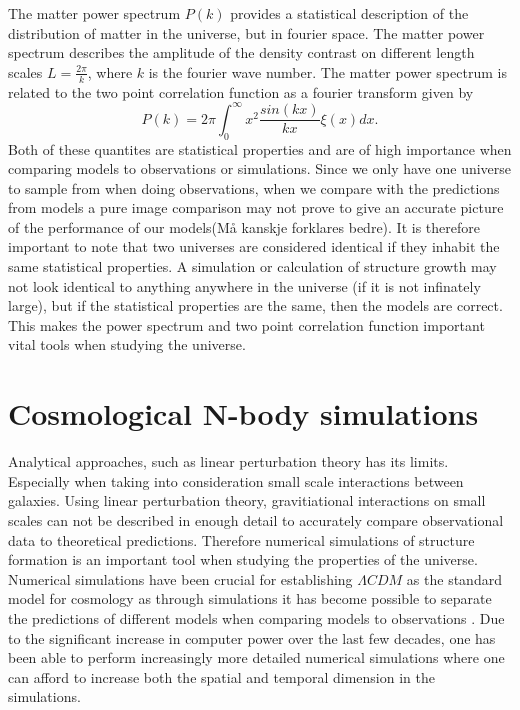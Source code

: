 The matter power spectrum $P(k)$ provides a statistical description of the
distribution of matter in the universe, but in fourier space. The matter power spectrum describes the amplitude of 
the density contrast on different length scales $L=\frac{2\pi}{k}$, where $k$ is
the fourier wave number. The matter power spectrum is related to the two point
correlation function as a fourier transform given by
\begin{equation}
    P(k)=2\pi\int_0^\infty x^2\frac{sin(kx)}{kx}\xi(x)dx.
\end{equation}
Both of these quantites are statistical properties and are of high importance
when comparing models to observations or simulations. Since we only have one
universe to sample from when doing observations, when we compare with the
predictions from models a pure image comparison may not prove to give an
accurate picture of the performance of our models(Må kanskje forklares bedre). It is therefore important to
note that two universes are considered identical if they inhabit the same
statistical properties. A simulation or calculation of structure growth may
not look identical to anything anywhere in the universe (if it is not infinately
large), but if the statistical properties are the same, then the models are
correct. This makes the power spectrum and two point correlation function
important vital tools when studying the universe.

\section{Cosmological N-body simulations}
Analytical approaches, such as linear perturbation theory has its limits.
Especially when taking into consideration small scale interactions between
galaxies. Using linear perturbation theory, gravitiational interactions on small scales can not be described in
enough detail to accurately compare observational data to theoretical
predictions. Therefore numerical simulations of structure formation is an
important tool when studying the properties of the universe. Numerical
simulations have been crucial for establishing $\Lambda CDM$ as the standard
model for cosmology as through simulations it has become possible to separate
the predictions of different models when comparing models to observations
\cite[p.~361]{schneider2006extragalactic}. Due to the significant increase in
computer power over the last few decades, one has been able to perform
increasingly more detailed numerical simulations where one can afford to
increase both the spatial and temporal dimension in the simulations.\\

